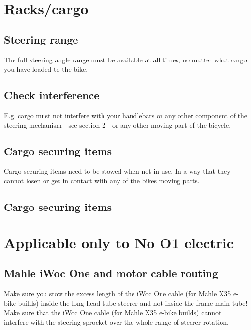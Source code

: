 \documentclass[12 pt]{article}
\newcommand{\bodyimage}[1]{\rightline{}}}
\begin{document}
\bodyimage{6_1_bio_frameset_rear_shift_cable_routing.svg}

\section{Racks/cargo}

\subsection{Steering range}

The full steering angle range must be available at all times, no
matter what cargo you have loaded to the bike.

\bodyimage{4_1_racks.svg}

\subsection{Check interference}

E.g. cargo must not interfere with your handlebars or any other
component of the steering mechanism—see section 2—or any other moving
part of the bicycle.

\bodyimage{4_2_racks.svg}

\subsection{Cargo securing items}

Cargo securing items need to be stowed when not in use. In a way that
they cannot losen or get in contact with any of the bikes moving
parts.

\bodyimage{4_3_racks_strap_good.svg}

\subsection{Cargo securing items}

\bodyimage{4_4_racks_strap_not_good.svg}

\section{Applicable only to No O1 electric}

\subsection{Mahle iWoc One and motor cable routing}

Make sure you stow the excess length of the iWoc One cable (for Mahle
X35 e-bike builds) inside the long head tube steerer and not inside
the frame main tube! Make sure that the iWoc One cable (for Mahle X35
e-bike builds) cannot interfere with the steering sprocket over the
whole range of steerer rotation.
\end{document}
